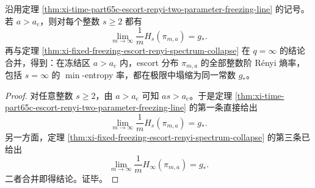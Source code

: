 \begin{corollary}\label{cor:xi-time-part65c-escort-all-integer-renyi-collapse}
沿用定理 \ref{thm:xi-time-part65c-escort-renyi-two-parameter-freezing-line} 的记号。若 \(a>a_{\mathrm c}\)，则对每个整数 \(s\ge 2\) 都有
\[
\boxed{\;
\lim_{m\to\infty}\frac{1}{m}H_s(\pi_{m,a})=g_*.\;}
\]
再与定理 \ref{thm:xi-fixed-freezing-escort-renyi-spectrum-collapse} 在 \(q=\infty\) 的结论合并，得到：在冻结区 \(a>a_{\mathrm c}\) 内，escort 分布 \(\pi_{m,a}\) 的全部整数阶 Rényi 熵率，包括 \(s=\infty\) 的 \(\min\)-entropy 率，都在极限中塌缩为同一常数 \(g_*\)。
\end{corollary}
\begin{proof}
对任意整数 \(s\ge 2\)，由 \(a>a_{\mathrm c}\) 可知 \(as>a_{\mathrm c}\)。于是定理 \ref{thm:xi-time-part65c-escort-renyi-two-parameter-freezing-line} 的第一条直接给出
\[
\lim_{m\to\infty}\frac{1}{m}H_s(\pi_{m,a})=g_*.
\]
另一方面，定理 \ref{thm:xi-fixed-freezing-escort-renyi-spectrum-collapse} 的第三条已给出
\[
\lim_{m\to\infty}\frac{1}{m}H_\infty(\pi_{m,a})=g_*.
\]
二者合并即得结论。证毕。
\end{proof}



